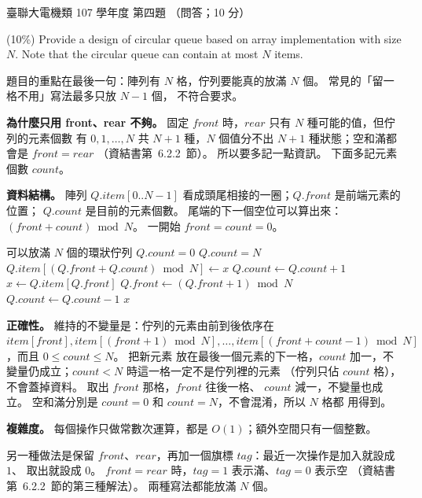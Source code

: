 \begin{pastexam}[label={px:ust-107-ee-ds-04}]{臺聯大電機類 107 學年度 第四題}
（問答；10 分）

(10\%) Provide a design of circular queue based on array implementation with size $N$. Note that the circular queue can contain at most $N$ items.
\end{pastexam}

\begin{pastsoln}
題目的重點在最後一句：陣列有 $N$ 格，佇列要能真的放滿 $N$ 個。 常見的「留一格不用」寫法最多只放 $N - 1$ 個，
不符合要求。

\textbf{為什麼只用 front、rear 不夠。} 固定 $\mathit{front}$ 時，$\mathit{rear}$ 只有 $N$ 種可能的值，但佇列的元素個數
有 $0, 1, \ldots, N$ 共 $N + 1$ 種，$N$ 個值分不出 $N + 1$ 種狀態；空和滿都會是 $\mathit{front} = \mathit{rear}$
（資結書第~6.2.2~節）。 所以要多記一點資訊。 下面多記元素個數 $\mathit{count}$。

\textbf{資料結構。} 陣列 $Q.\mathit{item}[0..N-1]$ 看成頭尾相接的一圈；$Q.\mathit{front}$ 是前端元素的位置；
$Q.\mathit{count}$ 是目前的元素個數。 尾端的下一個空位可以算出來：$(\mathit{front} + \mathit{count}) \bmod N$。
一開始 $\mathit{front} = \mathit{count} = 0$。

\begin{pseudo}{可以放滿 $N$ 個的環狀佇列}
    \State \Return $Q.\mathit{count} = 0$
\EndFunction
\Statex
{}
    \State \Return $Q.\mathit{count} = N$
\EndFunction
\Statex
{}
        \State {}
    \EndIf
    \State $Q.\mathit{item}[(Q.\mathit{front} + Q.\mathit{count}) \bmod N] \gets x$
    \State $Q.\mathit{count} \gets Q.\mathit{count} + 1$
\EndProcedure
\Statex
{}
        \State {}
    \EndIf
    \State $x \gets Q.\mathit{item}[Q.\mathit{front}]$
    \State $Q.\mathit{front} \gets (Q.\mathit{front} + 1) \bmod N$
    \State $Q.\mathit{count} \gets Q.\mathit{count} - 1$
    \State \Return $x$
\EndFunction
\end{pseudo}

\textbf{正確性。} 維持的不變量是：佇列的元素由前到後依序在
$\mathit{item}[\mathit{front}], \mathit{item}[(\mathit{front}+1) \bmod N], \ldots,
\mathit{item}[(\mathit{front}+\mathit{count}-1) \bmod N]$，而且 $0 \le \mathit{count} \le N$。  把新元素
放在最後一個元素的下一格，$\mathit{count}$ 加一，不變量仍成立；$\mathit{count} < N$ 時這一格一定不是佇列裡的元素
（佇列只佔 $\mathit{count}$ 格），不會蓋掉資料。  取出 $\mathit{front}$ 那格，$\mathit{front}$ 往後一格、
$\mathit{count}$ 減一，不變量也成立。 空和滿分別是 $\mathit{count} = 0$ 和 $\mathit{count} = N$，不會混淆，所以 $N$ 格都
用得到。

\textbf{複雜度。} 每個操作只做常數次運算，都是 $O(1)$；額外空間只有一個整數。

另一種做法是保留 $\mathit{front}$、$\mathit{rear}$，再加一個旗標 $\mathit{tag}$：最近一次操作是加入就設成 $1$、
取出就設成 $0$。 $\mathit{front} = \mathit{rear}$ 時，$\mathit{tag} = 1$ 表示滿、$\mathit{tag} = 0$ 表示空
（資結書第~6.2.2~節的第三種解法）。 兩種寫法都能放滿 $N$ 個。
\end{pastsoln}
